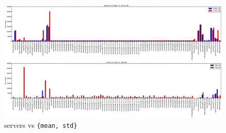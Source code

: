 \begin{figure}[t]
\centering
\includegraphics*[width=1.0\linewidth]{figures/happy-servers-mean-std}
\caption{servers vs \texttt{\{mean, std\}}}
\label{fig:v6cloud}
\end{figure}

